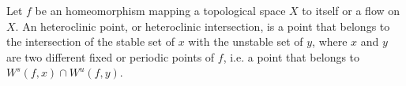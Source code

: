 \documentclass[12pt]{article}
\begin{document}
Let $f$ be an homeomorphism mapping a topological space $X$ to itself or a flow on $X$. An heteroclinic point, or heteroclinic intersection, is a point that belongs to the intersection of the stable set of $x$ with the unstable set of $y$, where $x$ and $y$ are two different fixed or periodic points of $f$, i.e. a point that belongs to $W^s(f,x)\cap W^u(f,y)$.
\end{document}
